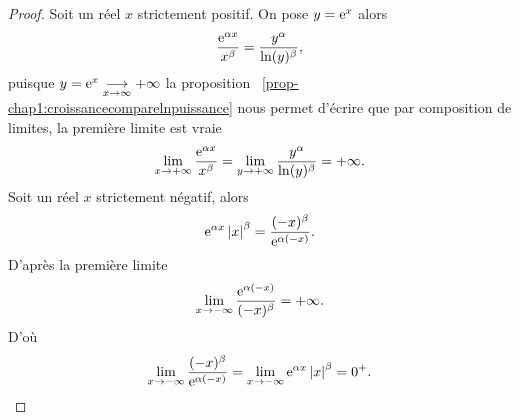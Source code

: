 \begin{proof}
    Soit un réel \(x\) strictement positif. On pose \(y=\operatorname{e}^{x}\) alors
    \begin{equation}
        \frac{\operatorname{e}^{\alpha x}}{x^\beta}=\frac{y^\alpha}{\ln(y)^\beta},
    \end{equation}
    puisque \(y = \operatorname{e}^{x} \underset{x \to \infty}{\longrightarrow}+\infty\) 
    la proposition~
\ref{prop-chap1:croissancecomparelnpuissance} nous permet 
    d'écrire que par composition de limites, la première limite est vraie
    \begin{equation}
        \lim\limits_{x \to + \infty} \frac{\operatorname{e}^{\alpha x}}{x^\beta}= 
        \lim\limits_{y \to +\infty} \frac{y^\alpha}{\ln(y)^\beta}=+\infty.
    \end{equation}
    Soit un réel \(x\) strictement négatif, alors
    \begin{equation}
        \operatorname{e}^{\alpha x}\left\lvert x\right\rvert^\beta=\frac{(-x)^\beta}{\operatorname{e}^{\alpha(-x)}}.
    \end{equation}
    D'après la première limite
    \begin{equation}
        \lim\limits_{x \to - \infty} \frac{\operatorname{e}^{\alpha 
        (-x)}}{(-x)^\beta}=+\infty.
    \end{equation}
    D'où
    \begin{equation}
        \lim\limits_{x\to -\infty}\frac{(-x)^\beta}{\operatorname{e}^{\alpha 
        (-x)}}=\lim\limits_{x \to -\infty} \operatorname{e}^{\alpha x} \left\lvert x\right\rvert^\beta=0^+.
    \end{equation}
\end{proof}
